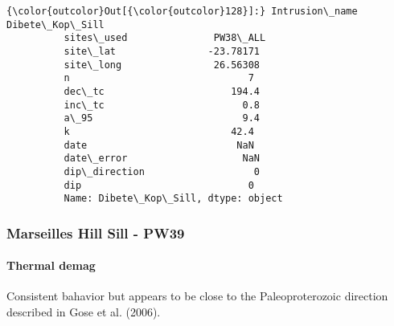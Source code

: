 \documentclass{article}
\begin{document}
            \begin{Verbatim}[commandchars=\\\{\}]
{\color{outcolor}Out[{\color{outcolor}128}]:} Intrusion\_name    Dibete\_Kop\_Sill
          sites\_used               PW38\_ALL
          site\_lat                -23.78171
          site\_long                26.56308
          n                               7
          dec\_tc                      194.4
          inc\_tc                        0.8
          a\_95                          9.4
          k                            42.4
          date                          NaN
          date\_error                    NaN
          dip\_direction                   0
          dip                             0
          Name: Dibete\_Kop\_Sill, dtype: object
\end{Verbatim}
        
    \subsubsection{Marseilles Hill Sill -
PW39}\label{marseilles-hill-sill---pw39}

    \paragraph{Thermal demag}\label{thermal-demag}

    Consistent bahavior but appears to be close to the Paleoproterozoic
direction described in Gose et al. (2006).
\end{document}

